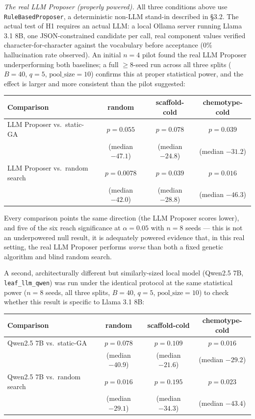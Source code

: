 \documentclass{article}
\begin{document}
\emph{The real LLM Proposer (properly powered).} All three conditions
above use \texttt{RuleBasedProposer}, a deterministic non-LLM stand-in
described in \S3.2. The actual test of H1 requires an actual LLM: a local
Ollama server running Llama 3.1 8B, one JSON-constrained candidate per
call, real component values verified character-for-character against the
vocabulary before acceptance (0\% hallucination rate observed). An initial
$n=4$ pilot found the real LLM Proposer underperforming both baselines; a
full $\ge 8$-seed run across all three splits ($B=40$, $q=5$,
$\text{pool\_size}=10$) confirms this at proper statistical power, and the
effect is larger and more consistent than the pilot suggested:

\begin{center}
\begin{tabular}{lccc}
\toprule
Comparison & random & scaffold-cold & chemotype-cold \\
\midrule
LLM Proposer vs.\ static-GA & $p=0.055$ & $p=0.078$ & $p=0.039$ \\
 & (median $-47.1$) & (median $-24.8$) & (median $-31.2$) \\
LLM Proposer vs.\ random search & $p=0.0078$ & $p=0.039$ & $p=0.016$ \\
 & (median $-42.0$) & (median $-28.8$) & (median $-46.3$) \\
\bottomrule
\end{tabular}
\end{center}

Every comparison points the same direction (the LLM Proposer scores
lower), and five of the six reach significance at $\alpha=0.05$ with
$n=8$ seeds --- this is not an underpowered null result, it is adequately
powered evidence that, in this real setting, the real LLM Proposer
performs \emph{worse} than both a fixed genetic algorithm and blind random
search.

A second, architecturally different but similarly-sized local model
(Qwen2.5 7B, \texttt{leaf\_llm\_qwen}) was run under the identical
protocol at the same statistical power ($n=8$ seeds, all three splits,
$B=40$, $q=5$, $\text{pool\_size}=10$) to check whether this result is
specific to Llama 3.1 8B:

\begin{center}
\begin{tabular}{lccc}
\toprule
Comparison & random & scaffold-cold & chemotype-cold \\
\midrule
Qwen2.5 7B vs.\ static-GA & $p=0.078$ & $p=0.109$ & $p=0.016$ \\
 & (median $-40.9$) & (median $-21.6$) & (median $-29.2$) \\
Qwen2.5 7B vs.\ random search & $p=0.016$ & $p=0.195$ & $p=0.023$ \\
 & (median $-29.1$) & (median $-34.3$) & (median $-43.4$) \\
\bottomrule
\end{tabular}
\end{center}
\end{document}
